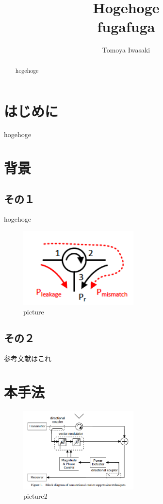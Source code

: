 \documentclass[a4j,pt]{jsarticle}
\begin{document}

\title{Hogehoge \\ fugafuga}

\author{
   Tomoya Iwasaki 
}

\begin{abstract}
hogehoge
\end{abstract}

\maketitle
\thispagestyle{empty}

\section{はじめに}
hogehoge


\section{背景}

\subsection{その１}

hogehoge\cite{example}
\begin{figure}[htbp]
    \begin{center}
        \includegraphics[width=6cm]{circulator.png}
        \caption{picture}
        \label{sample}
    \end{center}
\end{figure}

\subsection{その２}

\cite{example2}参考文献はこれ



\section{本手法}

\begin{figure}[htbp]
    \begin{center}
        \includegraphics[width=6cm]{diagram_VectorModulation.png}
        \caption{picture2}
        \label{sample}
    \end{center}
\end{figure}




\end{document}
